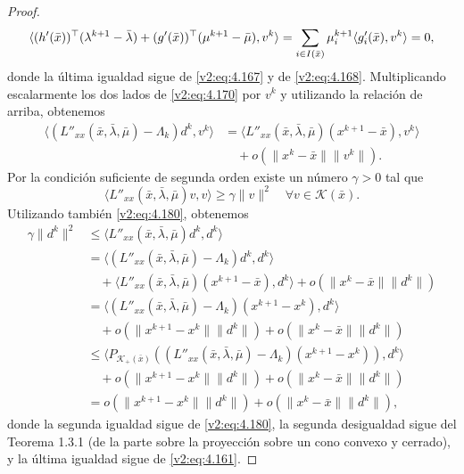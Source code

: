 \begin{proof}
    \begin{equation}
        \langle (h'(\bar{x}))^\top(\lambda^{k+1} - \bar{\lambda}) + (g'(\bar{x}))^\top(\mu^{k+1} - \bar{\mu}), v^k \rangle \nonumber \\
        = \sum_{i \in I(\bar{x})} \mu_i^{k+1} \langle g'_i(\bar{x}), v^k \rangle = 0,
    \end{equation}
    donde la última igualdad sigue de \eqref{v2:eq:4.167} y de \eqref{v2:eq:4.168}. Multiplicando escalarmente los dos lados de \eqref{v2:eq:4.170} por $v^k$ y utilizando la relación de arriba, obtenemos
    \begin{align}
        \langle (L''_{xx}(\bar{x}, \bar{\lambda}, \bar{\mu}) - \Lambda_k) d^k, v^k \rangle &= \langle L''_{xx}(\bar{x}, \bar{\lambda}, \bar{\mu})(x^{k+1} - \bar{x}), v^k \rangle \nonumber \\
        &\quad + o(\|x^k - \bar{x}\|\|v^k\|).
        \label{v2:eq:4.180}
    \end{align}
    Por la condición suficiente de segunda orden existe un número $\gamma > 0$ tal que
    \[
        \langle L''_{xx}(\bar{x}, \bar{\lambda}, \bar{\mu})v, v \rangle \ge \gamma \|v\|^2 \quad \forall v \in \mathcal{K}(\bar{x}).
    \]
    Utilizando también \eqref{v2:eq:4.180}, obtenemos
    \begin{align*}
        \gamma\|d^k\|^2 &\le \langle L''_{xx}(\bar{x}, \bar{\lambda}, \bar{\mu})d^k, d^k \rangle \\
        &= \langle (L''_{xx}(\bar{x}, \bar{\lambda}, \bar{\mu}) - \Lambda_k)d^k, d^k \rangle \\
        &\quad + \langle L''_{xx}(\bar{x}, \bar{\lambda}, \bar{\mu})(x^{k+1} - \bar{x}), d^k \rangle + o(\|x^k - \bar{x}\|\|d^k\|) \\
        &= \langle (L''_{xx}(\bar{x}, \bar{\lambda}, \bar{\mu}) - \Lambda_k)(x^{k+1} - x^k), d^k \rangle \\
        &\quad + o(\|x^{k+1} - x^k\|\|d^k\|) + o(\|x^k - \bar{x}\|\|d^k\|) \\
        &\le \langle P_{\mathcal{K}_+(\bar{x})} ((L''_{xx}(\bar{x}, \bar{\lambda}, \bar{\mu}) - \Lambda_k)(x^{k+1} - x^k)), d^k \rangle \\
        &\quad + o(\|x^{k+1} - x^k\|\|d^k\|) + o(\|x^k - \bar{x}\|\|d^k\|) \\
        &= o(\|x^{k+1} - x^k\|\|d^k\|) + o(\|x^k - \bar{x}\|\|d^k\|),
    \end{align*}
    donde la segunda igualdad sigue de \eqref{v2:eq:4.180}, la segunda desigualdad sigue del Teorema 1.3.1 (de la parte sobre la proyección sobre un cono convexo y cerrado), y la última igualdad sigue de \eqref{v2:eq:4.161}.

\end{proof}
